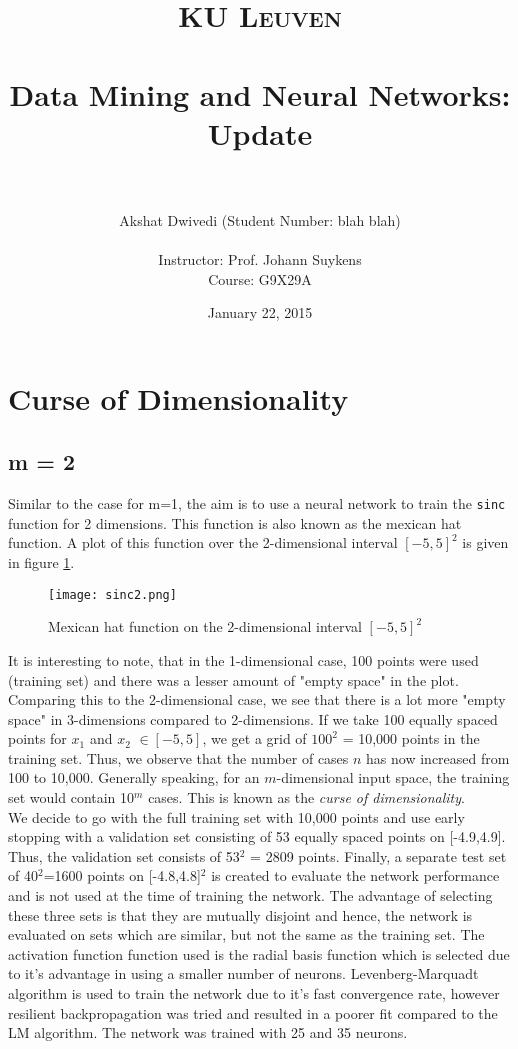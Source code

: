 \documentclass[paper=a4, fontsize=11pt]{scrartcl} %
\title{	
\normalfont \normalsize 
\textsc{\Large KU Leuven} \\ [30pt] %
\horrule{0.5pt} \\[0.4cm] %
\huge Data Mining and Neural Networks: \textbf{Update} \\ %
\horrule{2pt} \\[0.5cm] %
}
\author{Akshat Dwivedi (Student Number: blah blah)\\
\\
Instructor: Prof. Johann Suykens\\
Course: G9X29A} %
\date{January 22, 2015} %
\numberwithin{equation}{section} %
\begin{document}
\maketitle %

\tableofcontents

\clearpage
\setcounter{page}{1}


\section{Curse of Dimensionality}
\subsection{m = 2}
Similar to the case for m=1, the aim is to use a neural network to train the \texttt{sinc} function for 2 dimensions. This function is also known as the mexican hat function. A plot of this function over the 2-dimensional interval $[-5,5]^2$ is given in figure \ref{sinc2}.

\begin{figure}[h]
\centering
\texttt{[image: sinc2.png]}
\caption{Mexican hat function on the 2-dimensional interval $[-5,5]^2$}
\label{sinc2}
\end{figure}

It is interesting to note, that in the 1-dimensional case, 100 points were used (training set) and there was a lesser amount of "empty space" in the plot. Comparing this to the 2-dimensional case, we see that there is a lot more "empty space" in 3-dimensions compared to 2-dimensions. If we take 100 equally spaced points for $x_1$ and $x_2$ $\in [-5,5]$, we get a grid of $100^2$ = 10,000 points in the training set. Thus, we observe that the number of cases $n$ has now increased from 100 to 10,000. Generally speaking, for an $m$-dimensional input space, the training set would contain 10$^m$ cases. This is known as the \emph{curse of dimensionality}.\\

We decide to go with the full training set with 10,000 points and use early stopping with a validation set consisting of 53 equally spaced points on [-4.9,4.9]. Thus, the validation set consists of 53$^2$ = 2809 points. Finally, a separate test set of 40$^2$=1600 points on [-4.8,4.8]$^2$ is created to evaluate the network performance and is not used at the time of training the network. The advantage of selecting these three sets is that they are mutually disjoint and hence, the network is evaluated on sets which are similar, but not the same as the training set. The activation function function used is the radial basis function which is selected due to it's advantage in using a smaller number of neurons. Levenberg-Marquadt algorithm is used to train the network due to it's fast convergence rate, however resilient backpropagation was tried and resulted in a poorer fit compared to the LM algorithm. The network was trained with 25 and 35 neurons. 
\end{document}
